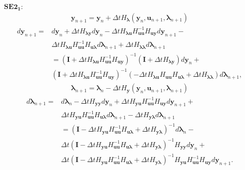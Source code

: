 \documentclass[a4paper, 10pt]{article}
\newcommand{\SEto}{SE2_1}
\begin{document}
$\bm{\SEto:}$
\begin{align}
      \bm{y}_{n+1} = \bm{y}_n + \Delta{t} H_{\bm{\lambda}}(\bm{y}_{n},\bm{u}_{n+1},\bm{\lambda}_{n+1})
\end{align}
\begin{equation}\label{eq_58}
\begin{aligned}
    d\bm{y}_{n+1} =  & d\bm{y}_n + \Delta{t}H_{\bm{\lambda y}}d\bm{y}_{n} -  \Delta{t} H_{\bm{\lambda u}}H_{\bm{uu}}^{-1}H_{\bm{uy}}d\bm{y}_{n+1} -  \\
    & \Delta{t} H_{\bm{\lambda u}} H_{\bm{uu}}^{-1}H_{\bm{u\lambda}}d\bm{\lambda}_{n+1} + \Delta{t} H_{\bm{\lambda \lambda}}d\bm{\lambda}_{n+1} \\
    & = (\bm{I} + \Delta{t}H_{\bm{\lambda u}}H^{-1}_{\bm{uu}}H_{\bm{uy}})^{-1}(\bm{I} + \Delta{t}H_{\bm{\lambda y}}) d\bm{y}_n + \\
    & (\bm{I} + \Delta{t}H_{\bm{\lambda u}}H^{-1}_{\bm{uu}}H_{\bm{uy}})^{-1}(-\Delta{t}H_{\bm{\lambda u}}H_{\bm{uu}}H_{\bm{u\lambda}} + \Delta{t}H_{\bm{\lambda\lambda}})  d\bm{\lambda}_{n+1},
\end{aligned}
\end{equation}
\begin{align}
      \bm{\lambda}_{n+1} = \bm{\lambda}_n - \Delta{t} H_{\bm{y}}(\bm{y}_{n},\bm{u}_{n+1},\bm{\lambda}_{n+1})
\end{align}
\begin{equation}\label{eq_60}
   \begin{aligned}
         d\bm{\lambda}_{n+1} =  & d\bm{\lambda}_n -\Delta{t}H_{\bm{y y}}d\bm{y}_{n} + \Delta{t} H_{\bm{yu}}H_{\bm{uu}}^{-1}H_{\bm{uy}}d\bm{y}_{n+1} +  \\
      & \Delta{t} H_{\bm{yu}}H_{\bm{uu}}^{-1}H_{\bm{u\lambda}}d\bm{\lambda}_{n+1} - \Delta{t} H_{\bm{y \lambda}}d\bm{\lambda}_{n+1} \\
      & =  (\bm{I} - \Delta{t}H_{\bm{yu}}H^{-1}_{\bm{uu}}H_{\bm{u\lambda}}+\Delta{t}H_{\bm{y\lambda}})^{-1} d\bm{\lambda}_n - \\
      & \Delta{t} (\bm{I} - \Delta{t}H_{\bm{y u}}H^{-1}_{\bm{uu}}H_{\bm{u\lambda}}+\Delta{t}H_{\bm{y\lambda}})^{-1}H_{\bm{yy}}d\bm{y}_{n} + \\
      & \Delta{t}(\bm{I} - \Delta{t}H_{\bm{y u}}H^{-1}_{\bm{uu}}H_{\bm{u\lambda}}+\Delta{t}H_{\bm{y\lambda}})^{-1}H_{\bm{yu}}H^{-1}_{\bm{uu}}H_{\bm{uy}}d\bm{y}_{n+1}.
   \end{aligned}
\end{equation}
\end{document}
